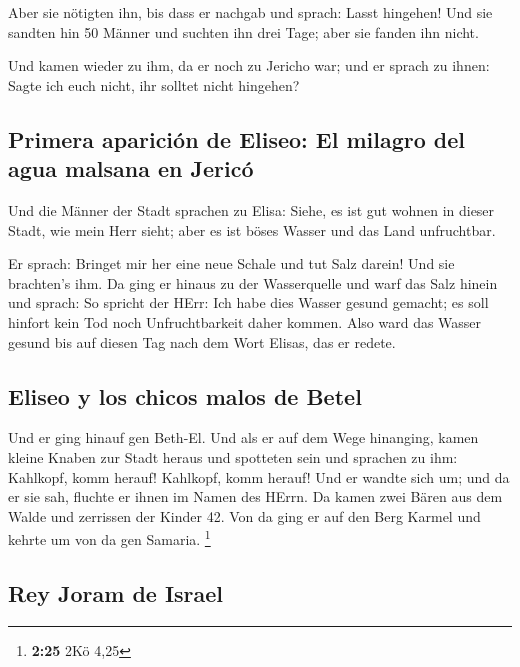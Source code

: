  Aber sie nötigten ihn, bis dass er nachgab und sprach:
Lasst hingehen! Und sie sandten hin 50 Männer und suchten ihn drei Tage;
aber sie fanden ihn nicht.

 Und kamen wieder zu ihm, da er noch zu Jericho war; und
er sprach zu ihnen: Sagte ich euch nicht, ihr solltet nicht hingehen?

\hypertarget{primera-apariciuxf3n-de-eliseo-el-milagro-del-agua-malsana-en-jericuxf3}{%
\subsection{Primera aparición de Eliseo: El milagro del agua malsana en
Jericó}\label{primera-apariciuxf3n-de-eliseo-el-milagro-del-agua-malsana-en-jericuxf3}}

 Und die Männer der Stadt sprachen zu Elisa: Siehe, es
ist gut wohnen in dieser Stadt, wie mein Herr sieht; aber es ist böses
Wasser und das Land unfruchtbar.

 Er sprach: Bringet mir her eine neue Schale und tut Salz
darein! Und sie brachten's ihm.  Da ging er hinaus zu der
Wasserquelle und warf das Salz hinein und sprach: So spricht der HErr:
Ich habe dies Wasser gesund gemacht; es soll hinfort kein Tod noch
Unfruchtbarkeit daher kommen.  Also ward das Wasser
gesund bis auf diesen Tag nach dem Wort Elisas, das er redete.

\hypertarget{eliseo-y-los-chicos-malos-de-betel}{%
\subsection{Eliseo y los chicos malos de
Betel}\label{eliseo-y-los-chicos-malos-de-betel}}

 Und er ging hinauf gen Beth-El. Und als er auf dem Wege
hinanging, kamen kleine Knaben zur Stadt heraus und spotteten sein und
sprachen zu ihm: Kahlkopf, komm herauf! Kahlkopf, komm herauf!
 Und er wandte sich um; und da er sie sah, fluchte er
ihnen im Namen des HErrn. Da kamen zwei Bären aus dem Walde und
zerrissen der Kinder 42.  Von da ging er auf den Berg
Karmel und kehrte um von da gen Samaria. \footnote{\textbf{2:25} 2Kö
  4,25}

\hypertarget{rey-joram-de-israel}{%
\subsection{Rey Joram de Israel}\label{rey-joram-de-israel}}

